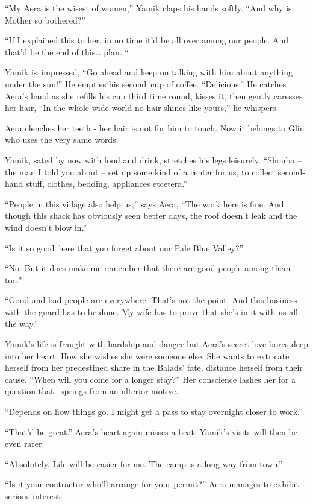 \documentclass[twoside,11pt]{book}
\begin{document}
{}``My Aera is the wisest of women,'' Yamik claps his hands softly. ``And why is Mother so bothered?''

{}``If I explained this to her, in no time it'd be all over among our people. And that'd be the end of this{\dots} plan.
``

Yamik is~impressed, ``Go ahead and keep on talking with him about anything under the sun!'' He empties his second~cup of
coffee. ``Delicious.'' He catches Aera's hand as she refills his cup third time round, kisses it, then gently caresses
her hair, ``In the whole wide world no hair shines like yours,'' he whispers.

Aera clenches her teeth - her hair is not for him to touch. Now it belongs to Glin who uses the very same words.~

Yamik, sated by now with food and drink, stretches his legs leisurely. ``Shouba -- the man I told you about -- set up
some kind of a center for us, to collect second-hand stuff, clothes, bedding, appliances etcetera.''

{}``People in this village also help us,'' says Aera, ``The work here is fine. And though this shack has obviously seen
better days, the roof doesn't leak and the wind doesn't blow in.''

{}``Is it so good~here that you forget about our Pale Blue Valley?''

{}``No. But it does make me remember that there are good people among them too.''

{}``Good and bad people are everywhere. That's not the point. And this business with the guard has to be done. My wife
has to prove that she's in it with us all the way.''

Yamik's life is fraught with hardship and danger but Aera's secret love bores deep into her heart. How she wishes she
were someone else. She wants to extricate herself from her predestined share in the Balads' fate, distance herself from
their cause. ``When will you come for a longer stay?'' Her conscience lashes her for a question that \ springs from an
ulterior motive.

{}``Depends on how things go. I might get a pass to stay overnight closer to work.''

{}``That'd be great.'' Aera's heart again misses a beat. Yamik's visits will then be even rarer.

{}``Absolutely. Life will be easier for me. The camp is a long way from town.''

{}``Is it your contractor who'll arrange for your permit?'' Aera manages to exhibit serious interest.
\end{document}
